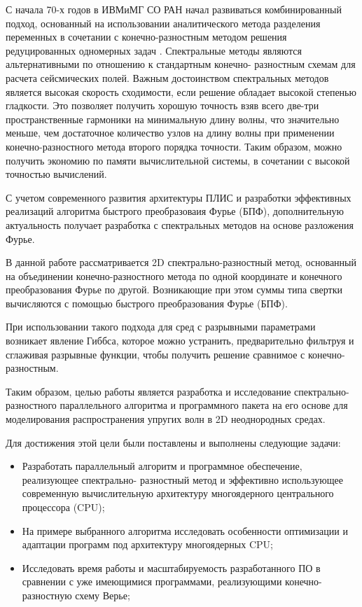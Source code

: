 С начала 70-х годов в ИВМиМГ СО РАН начал развиваться комбинированный подход, основанный на использовании аналитического метода разделения переменных в сочетании с конечно-разностным методом решения редуцированных одномерных задач \cite{alex}. Спектральные методы являются альтернативными по отношению к стандартным конечно-
разностным схемам для расчета сейсмических полей. Важным достоинством
спектральных методов является высокая скорость сходимости, если решение обладает
высокой степенью гладкости. Это позволяет получить хорошую точность взяв всего две-три
пространственные гармоники на минимальную длину волны, что значительно меньше, 
чем достаточное количество узлов на длину волны при применении конечно-разностного метода второго порядка точности.
Таким образом, можно получить экономию по памяти вычислительной системы, в сочетании с высокой точностью вычислений.

С учетом современного развития архитектуры ПЛИС и разработки эффективных реализаций алгоритма быстрого преобразоваия Фурье (БПФ), дополнительную актуальность получает разработка с спектральных методов на основе разложения Фурье.

В данной работе рассматривается 2D спектрально-разностный метод, основанный на
объединении конечно-разностного метода по одной координате и конечного
преобразования Фурье по другой. Возникающие при этом суммы
типа свертки вычисляются с помощью быстрого преобразования Фурье (БПФ).

При использовании такого подхода для сред с разрывными параметрами возникает явление Гиббса,
которое можно устранить, предварительно фильтруя и сглаживая разрывные функции,
чтобы получить решение сравнимое с конечно-разностным.

Таким образом, целью работы является разработка  и исследование спектрально-разностного
параллельного алгоритма и программного пакета на его основе для моделирования распространения
упругих волн в 2D неоднородных средах.

Для достижения этой цели были поставлены и выполнены следующие задачи:
\begin{itemize}
    \item Разработать параллельный алгоритм и программное обеспечение, реализующее спектрально-
разностный метод и эффективно использующее современную вычислительную
архитектуру многоядерного центрального процессора (CPU);
    \item На примере выбранного алгоритма исследовать особенности оптимизации и адаптации программ под архитектуру многоядерных CPU;
    \item Исследовать время работы и масштабируемость разработанного ПО в
сравнении с уже имеющимися программами, реализующими конечно-разностную схему
Верье;
\end{itemize}

